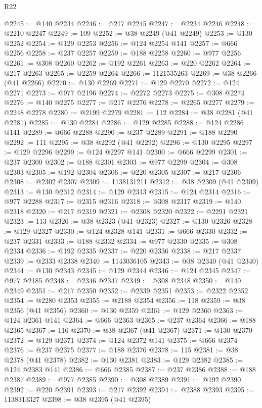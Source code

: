 \begin{lexlean}{R22}
\begin{coremodule}
@2245 := @140 @2244
@2246 := @217 @2245
@2247 := @2234 @2246
@2248 := @2210 @2247
@2249 := 109
@2252 := @38 @2249 (@41 @2249)
@2253 := @130 @2252
@2254 := @129 @2253
@2256 := @124 @2254 @141
@2257 := @666 @2256
@2258 := @237 @2257
@2259 := @188 @2258
@2260 := @977 @2256
@2261 := @308 @2260
@2262 := @192 @2261
@2263 := @220 @2262
@2264 := @217 @2263
@2265 := @2259 @2264
@2266 := 1121535263
@2269 := @38 @2266 (@41 @2266)
@2270 := @130 @2269
@2271 := @129 @2270
@2272 := @124 @2271
@2273 := @977 @2196
@2274 := @2272 @2273
@2275 := @308 @2274
@2276 := @140 @2275
@2277 := @217 @2276
@2278 := @2265 @2277
@2279 := @2248 @2278
@2280 := @2199 @2279
@2281 := 112
@2284 := @38 @2281 (@41 @2281)
@2285 := @130 @2284
@2286 := @129 @2285
@2288 := @124 @2286 @141
@2289 := @666 @2288
@2290 := @237 @2289
@2291 := @188 @2290
@2292 := 111
@2295 := @38 @2292 (@41 @2292)
@2296 := @130 @2295
@2297 := @129 @2296
@2299 := @124 @2297 @141
@2300 := @666 @2299
@2301 := @237 @2300
@2302 := @188 @2301
@2303 := @977 @2299
@2304 := @308 @2303
@2305 := @192 @2304
@2306 := @220 @2305
@2307 := @217 @2306
@2308 := @2302 @2307
@2309 := 1138131211
@2312 := @38 @2309 (@41 @2309)
@2313 := @130 @2312
@2314 := @129 @2313
@2315 := @124 @2314
@2316 := @977 @2288
@2317 := @2315 @2316
@2318 := @308 @2317
@2319 := @140 @2318
@2320 := @217 @2319
@2321 := @2308 @2320
@2322 := @2291 @2321
@2323 := 113
@2326 := @38 @2323 (@41 @2323)
@2327 := @130 @2326
@2328 := @129 @2327
@2330 := @124 @2328 @141
@2331 := @666 @2330
@2332 := @237 @2331
@2333 := @188 @2332
@2334 := @977 @2330
@2335 := @308 @2334
@2336 := @192 @2335
@2337 := @220 @2336
@2338 := @217 @2337
@2339 := @2333 @2338
@2340 := 1143036105
@2343 := @38 @2340 (@41 @2340)
@2344 := @130 @2343
@2345 := @129 @2344
@2346 := @124 @2345
@2347 := @977 @2185
@2348 := @2346 @2347
@2349 := @308 @2348
@2350 := @140 @2349
@2351 := @217 @2350
@2352 := @2339 @2351
@2353 := @2322 @2352
@2354 := @2280 @2353
@2355 := @2188 @2354
@2356 := 118
@2359 := @38 @2356 (@41 @2356)
@2360 := @130 @2359
@2361 := @129 @2360
@2363 := @124 @2361 @141
@2364 := @666 @2363
@2365 := @237 @2364
@2366 := @188 @2365
@2367 := 116
@2370 := @38 @2367 (@41 @2367)
@2371 := @130 @2370
@2372 := @129 @2371
@2374 := @124 @2372 @141
@2375 := @666 @2374
@2376 := @237 @2375
@2377 := @188 @2376
@2378 := 115
@2381 := @38 @2378 (@41 @2378)
@2382 := @130 @2381
@2383 := @129 @2382
@2385 := @124 @2383 @141
@2386 := @666 @2385
@2387 := @237 @2386
@2388 := @188 @2387
@2389 := @977 @2385
@2390 := @308 @2389
@2391 := @192 @2390
@2392 := @220 @2391
@2393 := @217 @2392
@2394 := @2388 @2393
@2395 := 1138313327
@2398 := @38 @2395 (@41 @2395)

\end{coremodule}
\end{lexlean}
